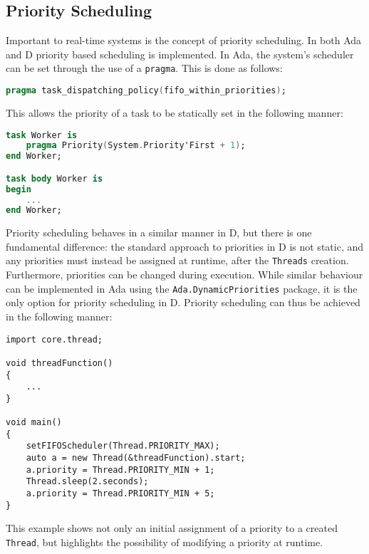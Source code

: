 \subsection{Priority Scheduling}
Important to real-time systems is the concept of priority scheduling. In both
Ada and D priority based scheduling is implemented. In Ada, the system's scheduler can
be set through the use of a \texttt{pragma}. This is done as follows: 
\begin{lstlisting}[basicstyle=\small,language=Ada]
pragma task_dispatching_policy(fifo_within_priorities); 
\end{lstlisting}
This allows the priority of a task to be statically set in the following manner: 
\begin{lstlisting}[basicstyle=\small,language=Ada]
task Worker is 
    pragma Priority(System.Priority'First + 1); 
end Worker;

task body Worker is 
begin 
    ...
end Worker; 
\end{lstlisting}
Priority scheduling behaves in a similar manner in D, but there is one
fundamental difference: the standard approach to priorities in D is not static, 
and any priorities must instead be assigned at runtime, after the
\texttt{Threads} creation. 
Furthermore, priorities can be changed during execution. While similar
behaviour can be implemented in Ada using the
\texttt{Ada.Dynamic\textunderscore{}Priorities}
package, it is the only option for priority scheduling in D. 
Priority scheduling can thus be achieved in the following manner: 
\begin{lstlisting}[basicstyle=\small]
import core.thread; 

void threadFunction()
{
    ...
}

void main()
{
    setFIFOScheduler(Thread.PRIORITY_MAX);
    auto a = new Thread(&threadFunction).start;
    a.priority = Thread.PRIORITY_MIN + 1; 
    Thread.sleep(2.seconds); 
    a.priority = Thread.PRIORITY_MIN + 5; 
}
\end{lstlisting}
This example shows not only an initial assignment of a priority to a created
\texttt{Thread}, but highlights the possibility of modifying a priority at
runtime. 

